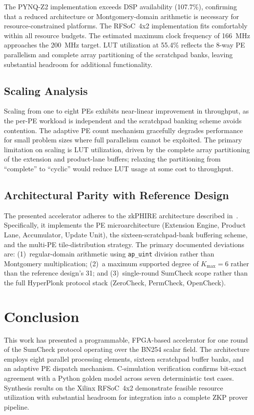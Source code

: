 \documentclass[conference]{IEEEtran}
\begin{document}
The PYNQ-Z2 implementation exceeds DSP availability (107.7\%), confirming that a reduced architecture or Montgomery-domain arithmetic is necessary for resource-constrained platforms. The RFSoC~4x2 implementation fits comfortably within all resource budgets. The estimated maximum clock frequency of 166~MHz approaches the 200~MHz target. LUT utilization at 55.4\% reflects the 8-way PE parallelism and complete array partitioning of the scratchpad banks, leaving substantial headroom for additional functionality.

\subsection{Scaling Analysis}

Scaling from one to eight PEs exhibits near-linear improvement in throughput, as the per-PE workload is independent and the scratchpad banking scheme avoids contention. The adaptive PE count mechanism gracefully degrades performance for small problem sizes where full parallelism cannot be exploited. The primary limitation on scaling is LUT utilization, driven by the complete array partitioning of the extension and product-lane buffers; relaxing the partitioning from ``complete'' to ``cyclic'' would reduce LUT usage at some cost to throughput.

\subsection{Architectural Parity with Reference Design}

The presented accelerator adheres to the zkPHIRE architecture described in~\cite{zkphire2026}. Specifically, it implements the PE microarchitecture (Extension Engine, Product Lane, Accumulator, Update Unit), the sixteen-scratchpad-bank buffering scheme, and the multi-PE tile-distribution strategy. The primary documented deviations are: (1)~regular-domain arithmetic using \texttt{ap\_uint} division rather than Montgomery multiplication; (2)~a maximum supported degree of $K_{\max}=6$ rather than the reference design's 31; and (3)~single-round SumCheck scope rather than the full HyperPlonk protocol stack (ZeroCheck, PermCheck, OpenCheck).

\section{Conclusion}

This work has presented a programmable, FPGA-based accelerator for one round of the SumCheck protocol operating over the BN254 scalar field. The architecture employs eight parallel processing elements, sixteen scratchpad buffer banks, and an adaptive PE dispatch mechanism. C-simulation verification confirms bit-exact agreement with a Python golden model across seven deterministic test cases. Synthesis results on the Xilinx RFSoC~4x2 demonstrate feasible resource utilization with substantial headroom for integration into a complete ZKP prover pipeline.
\end{document}
